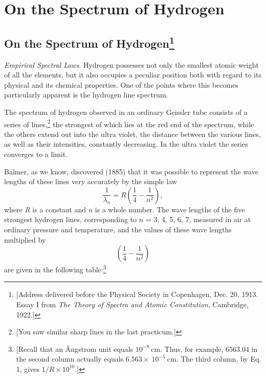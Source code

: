 \chapter{On the Spectrum of Hydrogen}\label{ch:bohr}


\renewcommand{\theequation}{\arabic{equation}}

\section*{On the Spectrum of Hydrogen\footnote{{[}Address delivered before the
  Physical Society in Copenhagen, Dec. 20, 1913. Essay I from \emph{The
  Theory of Spectra and Atomic Constitution}, Cambridge, 1922.{]}}}

\emph{Empirical Spectral Laws}. Hydrogen possesses not only the smallest
atomic weight of all the elements, but it also occupies a peculiar
position both with regard to its physical and its chemical properties.
One of the points where this becomes particularly apparent is the
hydrogen line spectrum.

The spectrum of hydrogen observed in an ordinary Geissler tube consists
of a series of lines,\footnote{{[}You saw similar sharp lines in the
  last practicum.{]}} the strongest of which lies at the red end of the
spectrum, while the others extend out into the ultra violet, the
distance between the various lines, as well as their intensities,
constantly decreasing. In the ultra violet the series converges to a
limit.

Balmer, as we know, discovered (1885) that it was possible to represent
the wave lengths of these lines very accurately by the simple law
%
\begin{equation}
\frac{1}{\lambda_n} = R\left(\frac{1}{4} - \frac{1}{n^2}\right) ,
\end{equation}
%
where \emph{R} is a constant and $n$ is a whole number. The wave
lengths of the five strongest hydrogen lines, corresponding to $n$
= 3, 4, 5, 6, 7, measured in air at ordinary pressure and temperature,
and the values of these wave lengths multiplied by
%
\begin{equation*}
\left(\frac{1}{4} - \frac{1}{n^2}\right)
\end{equation*}
%
are given in the following table:\footnote{{[}Recall that an Ångstrom
  unit equals $10^{-8}\ \text{cm}$. Thus, for example, 6563.04 in the second column
  actually equals $6.563 \times\  10^{-5}\ \text{cm}$. The third column,
  by Eq. 1, gives $1/R \times 10^{10}$.{]}}

